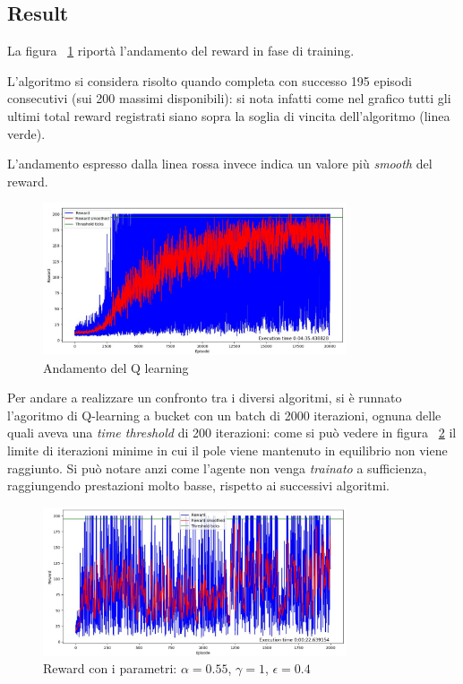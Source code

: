 \subsection{Result}
La figura ~\ref{fig:QLearning_result} riportà l'andamento del reward in fase di training. 

L'algoritmo si considera risolto quando completa con successo 195 episodi consecutivi (sui 200 massimi disponibili): si nota infatti come nel grafico tutti gli ultimi total reward registrati siano sopra la soglia di vincita dell'algoritmo (linea verde).

L'andamento espresso dalla linea rossa invece indica un valore più \textit{smooth} del reward.

\begin{figure}[!h]
	\centering
	\includegraphics[width=0.8\textwidth]{Immagini/reward_20K.JPG}
	\caption{Andamento del Q learning}
	\label{fig:QLearning_result}
\end{figure}

Per andare a realizzare un confronto tra i diversi algoritmi, si è runnato l'agoritmo di Q-learning a bucket con un batch di 2000 iterazioni, ognuna delle  quali aveva una \textit{time threshold} di 200 iterazioni: come si può vedere in figura ~\ref{fig:QLearning_poor_result} il limite di iterazioni minime in cui il pole viene mantenuto in equilibrio non viene raggiunto. Si può notare anzi come l'agente non venga \textit{trainato} a sufficienza, raggiungendo prestazioni molto basse, rispetto ai successivi algoritmi.

\begin{figure}[!h]
	\centering
	\includegraphics[width=0.8\textwidth]{Immagini/reward_2K_a0_55_g1_eps0_4.JPG}
	\caption{Reward con i parametri: $\alpha = 0.55$, $\gamma = 1$, $\epsilon = 0.4$}
	\label{fig:QLearning_poor_result}
\end{figure}

